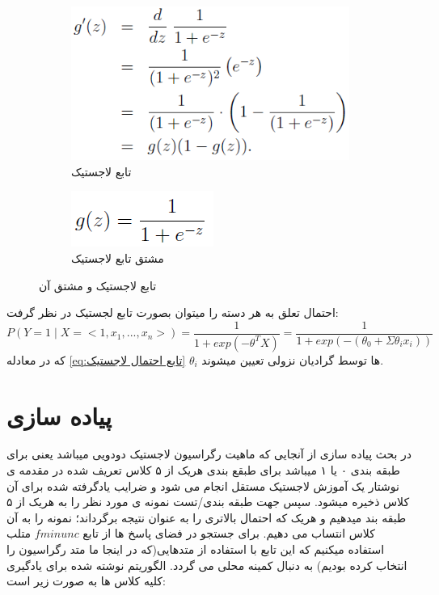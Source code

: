\documentclass[10pt,a4paper]{article}
\begin{document}
\begin{figure}[H]
    \centering
    \begin{subfigure}[b]{0.49\textwidth}
        \includegraphics[width=\textwidth]{gzprim}
        \caption{تابع لاجستیک}
    \end{subfigure} 
    \begin{subfigure}[b]{0.49\textwidth}
        \begin{center}
        \includegraphics[scale=0.5]{gz}
        \end{center}
        \caption{مشتق تابع لاجستیک}
    \end{subfigure}
    \caption{تابع لاجستیک و مشتق آن}
    \label{fig:تابع لاجستیک}
\end{figure}
احتمال تعلق به هر دسته را میتوان بصورت تابع لجستيک در نظر گرفت:
\begin{equation}
P(Y=1 \mid X = <1, x_1,...,x_n>) = \frac{1}{1+exp(-\theta^TX)} = \frac{1}{1+exp(-(\theta_0 + \Sigma\theta_ix_i))}
\label{eq:تابع احتمال لاجستیک}
\end{equation}
که در معادله
\ref{eq:تابع احتمال لاجستیک}
$\theta_i$
ها توسط گرادیان نزولی تعیین میشوند.
\section{پیاده سازی}
در بحث پیاده سازی از آنجایی که ماهیت رگراسیون لاجستیک دودویی میباشد یعنی برای طبقه بندی ۰ یا ۱ میباشد برای طبقع بندی هریک از ۵ کلاس تعریف شده در مقدمه ی نوشتار یک آموزش لاجستیک مستقل انجام می شود و ضرایب یادگرفته شده برای آن کلاس ذخیره میشود. سپس جهت طبقه بندی/تست نمونه ی مورد نظر را به هریک از ۵ طبقه بند میدهیم و هریک که احتمال بالاتری را به عنوان نتیجه برگرداند؛ نمونه را به آن کلاس انتساب می دهیم.
برای جستجو در فضای پاسخ ها از تابع
$fminunc$
متلب استفاده میکنیم که این تابع با استفاده از متدهایی(که در اینجا ما متد رگراسیون را انتخاب کرده بودیم) به دنبال کمینه محلی می گردد.
الگوریتم نوشته شده برای یادگیری کلیه کلاس ها به صورت زیر است:
\begin{latin}

\end{latin}
\end{document}
